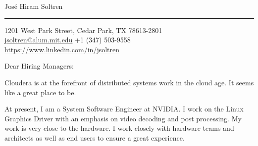 \documentclass{letter} %
\begin{document}
\signature{Jos\'e Hiram Soltren}           %
\longindentation=0pt                       %
\let\raggedleft\raggedright                %


\begin{letter}{
}

\begin{flushleft}
{\LARGE\sffamily Jos\'e Hiram Soltren}
\end{flushleft}
\medskip\hrule height 1pt
\begin{flushright}
\hfill 1201 West Park Street, Cedar Park, TX 78613-2801 \\
\hfill {} \href{mailto:jsoltren@alum.mit.edu}{jsoltren@alum.mit.edu}
        +1 (347) 503-9558 \\
\hfill {} \url{https://www.linkedin.com/in/jsoltren}
\end{flushright}
\vfill %


\opening{Dear Hiring Managers:}


Cloudera is at the forefront of distributed systems work in the cloud age.
It seems like a great place to be.


At present, I am a System Software Engineer at NVIDIA. I work on the Linux
Graphics Driver with an emphasis on video decoding and post processing. My
work is very close to the hardware. I work closely with hardware teams and
architects as well as end users to ensure a great experience.


\end{letter}
\end{document}
